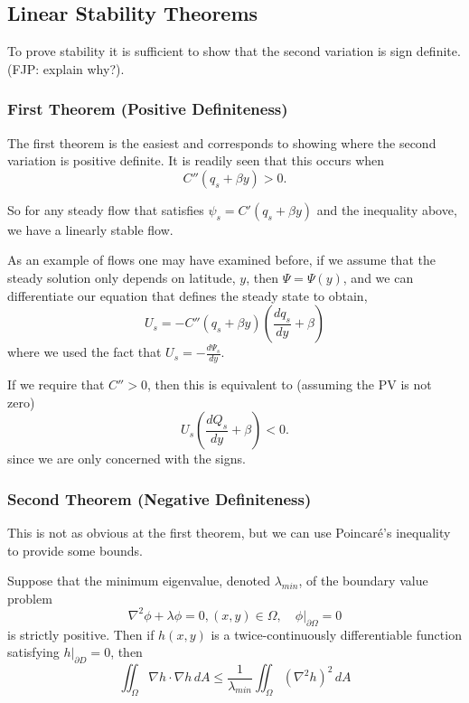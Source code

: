 \documentclass[12pt]{article}
\begin{document}
{    \subsection{Linear Stability Theorems}{
        To prove stability it is sufficient to show that the second variation is sign definite. (FJP: explain why?).

        \subsubsection{First Theorem (Positive Definiteness)}{
            The first theorem is the easiest and corresponds to showing where the second variation is positive definite.  It is readily seen that this occurs when
            $$
            C''(q_s + \beta y) > 0.
            $$

            So for any steady flow that satisfies $\psi_s = C'(q_s + \beta y)$ and the inequality above, we have a linearly stable flow.

            As an example of flows one may have examined before, if we assume that the steady solution only depends on latitude, $y$, then $\Psi = \Psi(y)$, and we can differentiate our equation that defines the steady state to obtain,
            $$
            U_s = -C''(q_s + \beta y) \left(\frac{dq_s}{dy} + \beta \right)
            $$
            where we used the fact that $U_s = - \frac{d \Psi_s}{dy}$.

            If we require that $C'' > 0$, then this is equivalent to (assuming the PV is not zero)
            $$
            U_s \left(\frac{d Q_s}{dy} + \beta \right) < 0.
            $$
            since we are only concerned with the signs.
        }

        \subsubsection{Second Theorem (Negative Definiteness)}{
            This is not as obvious at the first theorem, but we can use Poincar\'e's inequality to provide some bounds.

            Suppose that the minimum eigenvalue, denoted $\lambda_{min}$, of the boundary value problem
            $$
                \nabla^2 \phi + \lambda \phi = 0, (x,y) \in \Omega, \quad
                \left. \phi \right|_{\partial \Omega} = 0
            $$
            is strictly positive. Then if $h(x,y)$ is a twice-continuously differentiable function satisfying $\left. h\right|_{\partial D} = 0$, then
            $$
                \iint_\Omega\nabla h \cdot\nabla h \, dA \le \frac{1}{\lambda_{min}}\iint_\Omega (\nabla^2 h)^2 \, dA
            $$

}}}
\end{document}
